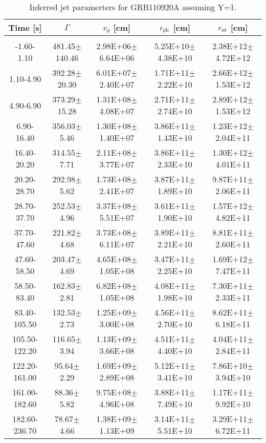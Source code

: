 \begin{table}[htp]
\scriptsize
\label{tab:}
\begin{tabular}{c c c c c}
Time [s] & $\Gamma$ & $r_0$ [cm] & $r_{\rm ph}$ [cm] & $r_{\rm nt}$ [cm] \\
\hline \hline\\ 

-1.60-1.10 & 481.45$\pm$140.46 & 2.98E+06$\pm$6.64E+06 & 5.25E+10$\pm$4.38E+10 & 2.38E+12$\pm$4.72E+12 \\ 

1.10-4.90 & 392.28$\pm$20.30 & 6.01E+07$\pm$2.40E+07 & 1.71E+11$\pm$2.22E+10 & 2.66E+12$\pm$1.53E+12 \\ 

4.90-6.90 & 373.29$\pm$15.28 & 1.31E+08$\pm$4.08E+07 & 2.71E+11$\pm$2.74E+10 & 2.89E+12$\pm$1.53E+12 \\ 

6.90-16.40 & 356.03$\pm$5.46 & 1.30E+08$\pm$1.40E+07 & 3.86E+11$\pm$1.43E+10 & 1.23E+12$\pm$2.04E+11 \\ 

16.40-20.20 & 314.55$\pm$7.71 & 2.11E+08$\pm$3.77E+07 & 3.86E+11$\pm$2.33E+10 & 1.30E+12$\pm$4.01E+11 \\ 

20.20-28.70 & 292.98$\pm$5.62 & 1.73E+08$\pm$2.41E+07 & 3.87E+11$\pm$1.89E+10 & 9.87E+11$\pm$2.06E+11 \\ 

28.70-37.70 & 252.53$\pm$4.96 & 3.37E+08$\pm$5.51E+07 & 3.61E+11$\pm$1.90E+10 & 1.57E+12$\pm$4.82E+11 \\ 

37.70-47.60 & 221.82$\pm$4.68 & 3.73E+08$\pm$6.11E+07 & 3.89E+11$\pm$2.21E+10 & 8.81E+11$\pm$2.60E+11 \\ 

47.60-58.50 & 203.47$\pm$4.69 & 4.65E+08$\pm$1.05E+08 & 3.47E+11$\pm$2.25E+10 & 1.69E+12$\pm$7.47E+11 \\ 

58.50-83.40 & 162.83$\pm$2.81 & 6.82E+08$\pm$1.05E+08 & 4.08E+11$\pm$1.98E+10 & 7.30E+11$\pm$2.33E+11 \\ 

83.40-105.50 & 132.53$\pm$2.73 & 1.25E+09$\pm$3.00E+08 & 4.56E+11$\pm$2.70E+10 & 8.62E+11$\pm$6.18E+11 \\ 

105.50-122.20 & 116.65$\pm$3.94 & 1.13E+09$\pm$3.66E+08 & 4.51E+11$\pm$4.40E+10 & 4.04E+11$\pm$2.84E+11 \\ 

122.20-161.00 & 95.64$\pm$2.29 & 1.69E+09$\pm$2.89E+08 & 5.12E+11$\pm$3.41E+10 & 7.86E+10$\pm$3.94E+10 \\ 

161.00-182.60 & 88.36$\pm$5.82 & 9.75E+08$\pm$4.96E+08 & 3.88E+11$\pm$7.49E+10 & 1.17E+11$\pm$9.92E+10 \\ 

182.60-236.70 & 78.67$\pm$4.66 & 1.38E+09$\pm$1.13E+09 & 3.14E+11$\pm$5.51E+10 & 3.29E+11$\pm$6.72E+11 \\ 

\end{tabular}
\caption{Inferred jet paramerters for GRB110920A assuming Y=1.}
\end{table}
